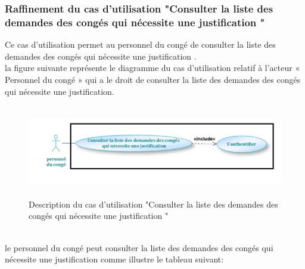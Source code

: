 \documentclass[12 pt ]{report}
\begin{document}
\subsubsection{Raffinement du cas d'utilisation "Consulter la liste des demandes des congés qui nécessite une justification "}
Ce cas d'utilisation permet au personnel du congé de consulter la liste des demandes des congés qui nécessite une justification .\\
la figure suivante représente le diagramme du cas d’utilisation  relatif à l’acteur « Personnel du congé » qui a le droit de consulter la liste des demandes des congés qui nécessite une justification.
\begin{figure}[h]
\begin{center}
\includegraphics[width= 13cm , height = 4cm]{cas_con_justififie.PNG}
\caption{Description du cas d'utilisation "Consulter la liste des demandes des congés qui nécessite une justification "}
\end{center}
\end{figure}\\
le personnel du congé peut consulter la liste des demandes des congés qui nécessite une justification  comme illustre le tableau suivant:
\end{document}
